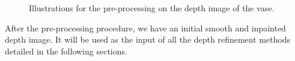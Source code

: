 \begin{figure}[!htbp]
\centering
{}
\caption{Illustrations for the pre-processing on the depth image of the vase.}
\label{fig:pre-processing}
\end{figure}

After the pre-processing procedure, we have an initial smooth and inpainted depth image. 
It will be used as the input of all the depth refinement methods detailed in the following sections.

